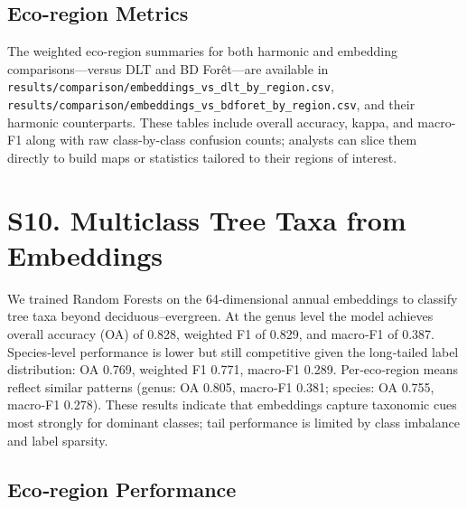\documentclass[utf8]{frontiers_suppmat}
\begin{document}
\subsection{Eco-region Metrics}

The weighted eco-region summaries for both harmonic and embedding comparisons—versus DLT and BD For\^et—are available in \texttt{results/comparison/embeddings\_vs\_dlt\_by\_region.csv}, \texttt{results/comparison/embeddings\_vs\_bdforet\_by\_region.csv}, and their harmonic counterparts. These tables include overall accuracy, kappa, and macro-F1 along with raw class-by-class confusion counts; analysts can slice them directly to build maps or statistics tailored to their regions of interest.

\section{S10. Multiclass Tree Taxa from Embeddings}

We trained Random Forests on the 64‑dimensional annual embeddings to classify tree taxa beyond deciduous–evergreen. At the genus level the model achieves overall accuracy (OA) of 0.828, weighted F1 of 0.829, and macro‑F1 of 0.387. Species‑level performance is lower but still competitive given the long‑tailed label distribution: OA 0.769, weighted F1 0.771, macro‑F1 0.289. Per‑eco‑region means reflect similar patterns (genus: OA 0.805, macro‑F1 0.381; species: OA 0.755, macro‑F1 0.278). These results indicate that embeddings capture taxonomic cues most strongly for dominant classes; tail performance is limited by class imbalance and label sparsity.

\subsection*{Eco‑region Performance}
\end{document}
